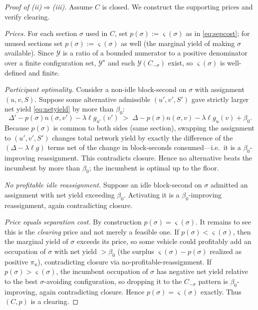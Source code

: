 \documentclass[11pt,twocolumn,a4paper]{article}
\theoremstyle{definition}
\theoremstyle{remark}
\newcommand{\yield}{\mathcal{Y}}
\newcommand{\blocktime}{\beta_0}
\newcommand{\sep}{\varsigma}
\begin{document}
\begin{proof}[Proof of \textup{(ii)}$\Rightarrow$\textup{(iii)}]
Assume $C$ is closed. We construct the supporting prices and verify clearing.

\emph{Prices.} For each section $\sigma$ used in $C$, set $p(\sigma) := \sep(\sigma)$ as in \eqref{eq:sepcost}; for unused sections set $p(\sigma) := \sep(\sigma)$ as well (the marginal yield of making $\sigma$ available). Since $\yield$ is a ratio of a bounded numerator to a positive denominator over a finite configuration set, $\yield^\star$ and each $\yield(C_{-\sigma})$ exist, so $\sep(\sigma)$ is well-defined and finite.

\emph{Participant optimality.} Consider a non-idle block-second on $\sigma$ with assignment $(u,v,S)$. Suppose some alternative admissible $(u',v',S')$ gave strictly larger net yield \eqref{eq:netyield} by more than $\blocktime$:
\[
\Delta' - p(\sigma)n(\sigma,v') - \lambda\ell g_{u'}(v') \;>\; \Delta - p(\sigma)n(\sigma,v) - \lambda\ell g_{u}(v) + \blocktime.
\]
Because $p(\sigma)$ is common to both sides (same section), swapping the assignment to $(u',v',S')$ changes total network yield by exactly the difference of the $(\Delta - \lambda\ell g)$ terms net of the change in block-seconds consumed---i.e.\ it is a $\blocktime$-improving reassignment. This contradicts closure. Hence no alternative beats the incumbent by more than $\blocktime$; the incumbent is optimal up to the floor.

\emph{No profitable idle reassignment.} Suppose an idle block-second on $\sigma$ admitted an assignment with net yield exceeding $\blocktime$. Activating it is a $\blocktime$-improving reassignment, again contradicting closure.

\emph{Price equals separation cost.} By construction $p(\sigma)=\sep(\sigma)$. It remains to see this is the \emph{clearing} price and not merely a feasible one. If $p(\sigma) < \sep(\sigma)$, then the marginal yield of $\sigma$ exceeds its price, so some vehicle could profitably add an occupation of $\sigma$ with net yield $> \blocktime$ (the surplus $\sep(\sigma)-p(\sigma)$ realized as positive $\pi_u$), contradicting closure via no-profitable-reassignment. If $p(\sigma) > \sep(\sigma)$, the incumbent occupation of $\sigma$ has negative net yield relative to the best $\sigma$-avoiding configuration, so dropping it to the $C_{-\sigma}$ pattern is $\blocktime$-improving, again contradicting closure. Hence $p(\sigma)=\sep(\sigma)$ exactly. Thus $(C,p)$ is a clearing.
\end{proof}
\end{document}
